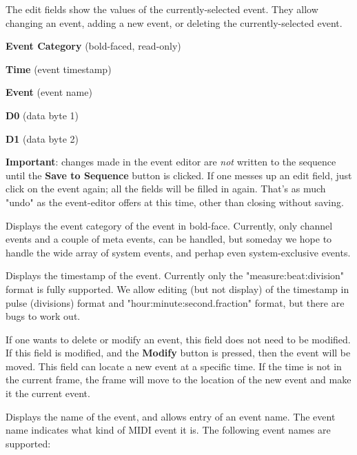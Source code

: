    The edit fields show the values of the currently-selected event.  They allow
   changing an event, adding a new event, or deleting the currently-selected
   event.

   \begin{enumber}
      \item \textbf{Event Category} (bold-faced, read-only)
      \item \textbf{Time} (event timestamp)
      \item \textbf{Event} (event name)
      \item \textbf{D0} (data byte 1)
      \item \textbf{D1} (data byte 2)
   \end{enumber}

   \textbf{Important}: changes made in the event editor
   are \textsl{not} written to the sequence until the \textbf{Save to Sequence}
   button is clicked.  If one messes up an edit field, just click on the event
   again; all the fields will be filled in again.
   That's as much "undo" as the event-editor offers at this time, other than
   closing without saving.

   \setcounter{ItemCounter}{0}      %

   Displays the event category of the event in bold-face.
   Currently, only channel events
   and a couple of meta events,
   can be handled, but someday we hope to handle the wide array of system
   events, and perhap even system-exclusive events.

   Displays the timestamp of the event.  Currently only the
   "measure:beat:division" format is fully supported.
   We allow editing (but not display) of the timestamp in
   pulse (divisions) format and "hour:minute:second.fraction" format, but
   there are bugs to work out.

   If one wants to delete or modify an event, this field does not need to be
   modified.  If this field is modified, and the \textbf{Modify}
   button is pressed, then the event will be moved.  This field can locate
   a new event at a specific time.  If the time is not in the current frame,
   the frame will move to the location of the new event and make it the current
   event.

   Displays the name of the event, and allows entry of an event name.
   The event name indicates what kind of MIDI event it is. 
   The following event names are supported:

